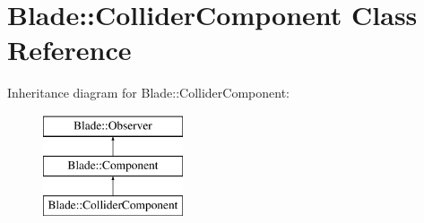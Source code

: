 \hypertarget{class_blade_1_1_collider_component}{}\section{Blade\+:\+:Collider\+Component Class Reference}
\label{class_blade_1_1_collider_component}
Inheritance diagram for Blade\+:\+:Collider\+Component\+:\begin{figure}[H]
\begin{center}
\leavevmode
\includegraphics[height=3.000000cm]{class_blade_1_1_collider_component}
\end{center}
\end{figure}
